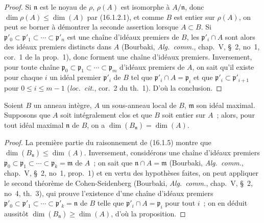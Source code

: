 \begin{proof}
Si $\mathfrak{n}$ est le noyau de $\rho$, $\rho(A)$ est isomorphe à
$A/\mathfrak{n}$, donc $\dim\rho(A)\leq\dim(A)$ par (16.1.2.1), et comme $B$
est entier sur $\rho(A)$, on peut se borner à démontrer la seconde assertion
lorsque $A\subset B$. Si
$\mathfrak{p}'_0\subset\mathfrak{p}'_1\subset\cdots\subset\mathfrak{p}'_n$
est une chaîne d'idéaux premiers de $B$, les $\mathfrak{p}'_i\cap A$ sont
alors des idéaux premiers distincts dans $A$ (Bourbaki, \emph{Alg.~comm.},
chap.~V, \S~2, no~1, cor.~1 de la prop.~1), donc forment une chaîne d'idéaux
premiers. Inversement, pour toute chaîne
$\mathfrak{p}_0\subset\mathfrak{p}_1\subset\cdots\subset\mathfrak{p}_m$
d'idéaux premiers de $A$, on sait qu'il existe pour chaque $i$ un idéal
premier $\mathfrak{p}'_i$ de $B$ tel que
$\mathfrak{p}'_i\cap A=\mathfrak{p}_i$ et que
$\mathfrak{p}'_i\subset\mathfrak{p}'_{i+1}$ pour $0\leq i\leq m-1$
(\emph{loc.~cit.}, cor.~2 du th.~1). D'où la conclusion.
\end{proof}

\begin{proposition}[16.1.6]
\label{0.16.1.6-fr}
Soient $B$ un anneau intègre, $A$ un sous-anneau local de $B$,
$\mathfrak{m}$ son idéal maximal. Supposons que $A$ soit intégralement clos et
que $B$ soit entier sur $A$~; alors, pour tout idéal maximal $\mathfrak{n}$ de
$B$, on a $\dim(B_{\mathfrak{n}})=\dim(A)$.
\end{proposition}

\begin{proof}
La première partie du raisonnement de (16.1.5) montre que
$\dim(B_{\mathfrak{n}})\leq\dim(A)$. Inversement, considérons une chaîne
d'idéaux premiers
$\mathfrak{p}_0\subset\mathfrak{p}_1\subset\cdots\subset
\mathfrak{p}_k=\mathfrak{m}$ de $A$~; on sait que
$\mathfrak{n}\cap A=\mathfrak{m}$ (Bourbaki, \emph{Alg.~comm.}, chap.~V,
\S~2, no~1, prop.~1) et en vertu des hypothèses faites, on peut appliquer le
second théorème de Cohen-Seidenberg (Bourbaki, \emph{Alg.~comm.}, chap.~V,
\S~2, no~4, th.~3), qui prouve l'existence d'une chaîne d'idéaux premiers
$\mathfrak{p}'_0\subset\mathfrak{p}'_1\subset\cdots\subset
\mathfrak{p}'_k=\mathfrak{n}$ de $B$ telle que
$\mathfrak{p}'_i\cap A=\mathfrak{p}_i$ pour tout $i$~; on en déduit aussitôt
$\dim(B_{\mathfrak{n}})\geq\dim(A)$, d'où la proposition.
\end{proof}

